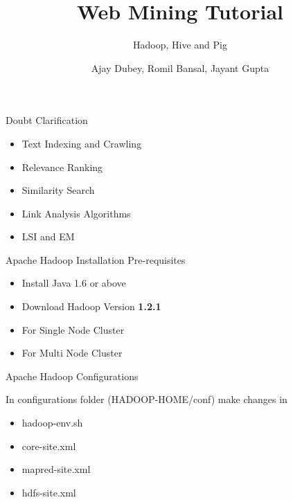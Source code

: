 \documentclass{beamer}
\title{Web Mining Tutorial}
\subtitle{Hadoop, Hive and Pig}
\author{Ajay Dubey, Romil Bansal, Jayant Gupta}
\begin{document}
\begin{frame}
\titlepage
\end{frame}

\begin{frame}{Doubt Clarification}
\begin{center}
\begin{itemize}
\item Text Indexing and Crawling
\item Relevance Ranking
\item Similarity Search
\item Link Analysis Algorithms
\item LSI and EM
\end{itemize}
 \end{center}
\end{frame}

\begin{frame}{Apache Hadoop Installation}
Pre-requisites 
\begin{center}
\begin{itemize}
\item Install Java 1.6 or above
\item Download Hadoop Version \textbf{1.2.1}
\item For Single Node Cluster \\ \href{http://www.michael-noll.com/tutorials/running-hadoop-on-ubuntu-linux-single-node-cluster/}{}
\item For Multi Node Cluster \\ \href{http://www.michael-noll.com/tutorials/running-hadoop-on-ubuntu-linux-multi-node-cluster/}{}
\end{itemize}
 \end{center}
\end{frame}

\begin{frame}{Apache Hadoop Configurations}
\begin{center}
In configurations folder  (HADOOP-HOME/conf) make changes in
\begin{itemize}
\item hadoop-env.sh
\item core-site.xml
\item mapred-site.xml
\item hdfs-site.xml
\end{itemize}
 \end{center}
\end{frame}
\end{document}
